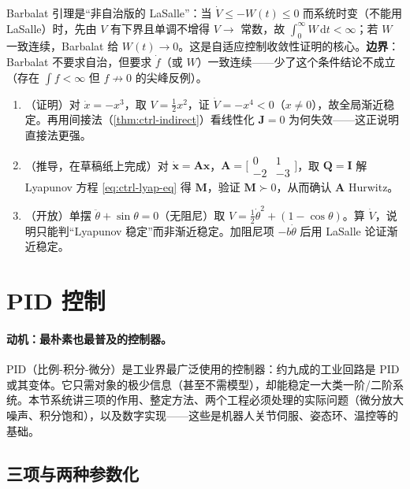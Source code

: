 \begin{insight}
Barbalat 引理是“非自治版的 LaSalle”：当 $\dot V\le-W(t)\le0$ 而系统时变（不能用 LaSalle）时，先由 $V$ 有下界且单调不增得 $V\to$ 常数，故 $\int_0^\infty W\,\mathrm dt<\infty$；若 $W$ 一致连续，Barbalat 给 $W(t)\to0$。这是自适应控制收敛性证明的核心。\textbf{边界}：Barbalat 不要求自治，但要求 $\dot f$（或 $W$）一致连续——少了这个条件结论不成立（存在 $\int f<\infty$ 但 $f\not\to0$ 的尖峰反例）。
\end{insight}

\begin{practice}
\begin{enumerate}
  \item （证明）对 $\dot x=-x^3$，取 $V=\tfrac12x^2$，证 $\dot V=-x^4<0$（$x\neq0$），故全局渐近稳定。再用间接法（\cref{thm:ctrl-indirect}）看线性化 $\mathbf{J}=0$ 为何失效——这正说明直接法更强。
  \item （推导，在草稿纸上完成）对 $\dot{\mathbf{x}}=\mathbf{A}\mathbf{x}$，$\mathbf{A}=\big[\begin{smallmatrix}0&1\\-2&-3\end{smallmatrix}\big]$，取 $\mathbf{Q}=\mathbf{I}$ 解 Lyapunov 方程 \cref{eq:ctrl-lyap-eq} 得 $\mathbf{M}$，验证 $\mathbf{M}\succ0$，从而确认 $\mathbf{A}$ Hurwitz。
  \item （开放）单摆 $\ddot\theta+\sin\theta=0$（无阻尼）取 $V=\tfrac12\dot\theta^2+(1-\cos\theta)$。算 $\dot V$，说明只能判“Lyapunov 稳定”而非渐近稳定。加阻尼项 $-b\dot\theta$ 后用 LaSalle 论证渐近稳定。
\end{enumerate}
\end{practice}

\section{PID 控制}
\label{sec:ctrl-pid}

\paragraph{动机：最朴素也最普及的控制器。}
PID（比例-积分-微分）是工业界最广泛使用的控制器：约九成的工业回路是 PID 或其变体。它只需对象的极少信息（甚至不需模型），却能稳定一大类一阶/二阶系统。本节系统讲三项的作用、整定方法、两个工程必须处理的实际问题（微分放大噪声、积分饱和），以及数字实现——这些是机器人关节伺服、姿态环、温控等的基础。

\subsection{三项与两种参数化}
\label{sec:ctrl-pid-three}

